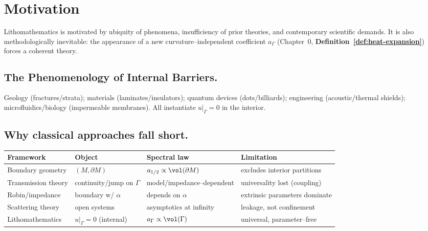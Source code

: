 \medskip


\section{Motivation}\label{sec:motivation}

Lithomathematics is motivated by ubiquity of phenomena, insufficiency of prior theories, and contemporary scientific demands.
It is also methodologically inevitable: the appearance of a new curvature–independent coefficient $a_\Gamma$ (Chapter~0, \textbf{Definition~\ref{def:heat-expansion}}) forces a coherent theory.

\subsection{The Phenomenology of Internal Barriers.}\label{subsec:phenomenology}
Geology (fractures/strata); materials (laminates/insulators); quantum devices (dots/billiards); engineering (acoustic/thermal shields); microfluidics/biology (impermeable membranes).
All instantiate $u|_\Gamma=0$ in the interior.

\subsection{Why classical approaches fall short.}\label{subsec:why-fall-short}
\begin{center}
\renewcommand{\arraystretch}{1.1}
\begin{tabular}{|l|l|l|l|}
\hline
\textbf{Framework} & \textbf{Object} & \textbf{Spectral law} & \textbf{Limitation} \\
\hline
Boundary geometry & $(M,\partial M)$ & $a_{1/2}\propto \vol(\partial M)$ & excludes interior partitions \\
\hline
Transmission theory & continuity/jump on $\Gamma$ & model/impedance–dependent & universality lost (coupling) \\
\hline
Robin/impedance & boundary w/ $\alpha$ & depends on $\alpha$ & extrinsic parameters dominate \\
\hline
Scattering theory & open systems & asymptotics at infinity & leakage, not confinement \\
\hline
Lithomathematics & $u|_\Gamma=0$ (internal) & $a_\Gamma\propto \vol(\Gamma)$ & universal, parameter–free \\
\hline
\end{tabular}
\end{center}

